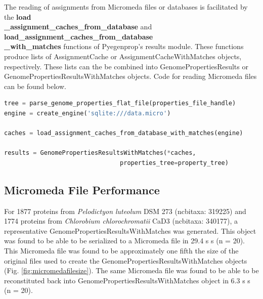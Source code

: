The reading of assignments from Micromeda files or databases is facilitated by 
the \textbf{load\\ \_assignment\_caches\_from\_database} and 
\textbf{load\_assignment\_caches\_from\_database \\ \_with\_matches} functions 
of Pyegenprop's results module. These functions produce lists of AssignmentCache 
or AssignmentCacheWithMatches objects, respectively. These lists can the be 
combined into GenomePropertiesResults or GenomePropertiesResultsWithMatches 
objects. Code for reading Micromeda files can be found below.

\FloatBarrier
\begin{lstlisting}[language=Python]  
tree = parse_genome_properties_flat_file(properties_file_handle)
engine = create_engine('sqlite:///data.micro')

caches = load_assignment_caches_from_database_with_matches(engine)

results = GenomePropertiesResultsWithMatches(*caches,          
                                properties_tree=property_tree)
\end{lstlisting}

\subsection{Micromeda File Performance} \label{micromeda-file-performance}

For 1877 proteins from \textit{Pelodictyon luteolum} DSM 273 (\gls{ncbitaxa}:  
319225) and 1774 proteins from \textit{Chlorobium chlorochromatii} CaD3 
(\gls{ncbitaxa}: 340177), a representative GenomePropertiesResultsWithMatches 
was generated. This object was found to be able to be serialized to a Micromeda 
file in 29.4 s  s (\gls{n} = 20). This Micromeda file was found to be 
approximately one fifth the size of the original files used to create the 
GenomePropertiesResultsWithMatches objects (Fig. \ref{fig:micromedafilesize}). 
The same Micromeda file was found to be able to be reconstituted back into 
GenomePropertiesResultsWithMatches object in 6.3 s  s (\gls{n} = 20).

